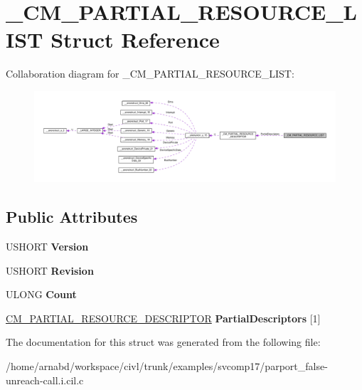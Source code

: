 \hypertarget{struct__CM__PARTIAL__RESOURCE__LIST}{}\section{\+\_\+\+C\+M\+\_\+\+P\+A\+R\+T\+I\+A\+L\+\_\+\+R\+E\+S\+O\+U\+R\+C\+E\+\_\+\+L\+I\+S\+T Struct Reference}
\label{struct__CM__PARTIAL__RESOURCE__LIST}


Collaboration diagram for \+\_\+\+C\+M\+\_\+\+P\+A\+R\+T\+I\+A\+L\+\_\+\+R\+E\+S\+O\+U\+R\+C\+E\+\_\+\+L\+I\+S\+T\+:
\nopagebreak
\begin{figure}[H]
\begin{center}
\leavevmode
\includegraphics[width=350pt]{struct__CM__PARTIAL__RESOURCE__LIST__coll__graph}
\end{center}
\end{figure}
\subsection*{Public Attributes}
\begin{DoxyCompactItemize}
\item 
\hypertarget{struct__CM__PARTIAL__RESOURCE__LIST_ab94e5eced92ff46b1ec836b2b3cce47b}{}U\+S\+H\+O\+R\+T {\bfseries Version}\label{struct__CM__PARTIAL__RESOURCE__LIST_ab94e5eced92ff46b1ec836b2b3cce47b}

\item 
\hypertarget{struct__CM__PARTIAL__RESOURCE__LIST_a8c9256f8dd3fc3ef32e3494a990fe2c6}{}U\+S\+H\+O\+R\+T {\bfseries Revision}\label{struct__CM__PARTIAL__RESOURCE__LIST_a8c9256f8dd3fc3ef32e3494a990fe2c6}

\item 
\hypertarget{struct__CM__PARTIAL__RESOURCE__LIST_ad9c29c0d3cd53e09afe81bc88aa889a7}{}U\+L\+O\+N\+G {\bfseries Count}\label{struct__CM__PARTIAL__RESOURCE__LIST_ad9c29c0d3cd53e09afe81bc88aa889a7}

\item 
\hypertarget{struct__CM__PARTIAL__RESOURCE__LIST_a03aa34d8fa0d42b09c399d7f9f9fd1d3}{}\hyperlink{struct__CM__PARTIAL__RESOURCE__DESCRIPTOR}{C\+M\+\_\+\+P\+A\+R\+T\+I\+A\+L\+\_\+\+R\+E\+S\+O\+U\+R\+C\+E\+\_\+\+D\+E\+S\+C\+R\+I\+P\+T\+O\+R} {\bfseries Partial\+Descriptors} \mbox{[}1\mbox{]}\label{struct__CM__PARTIAL__RESOURCE__LIST_a03aa34d8fa0d42b09c399d7f9f9fd1d3}

\end{DoxyCompactItemize}


The documentation for this struct was generated from the following file\+:\begin{DoxyCompactItemize}
\item 
/home/arnabd/workspace/civl/trunk/examples/svcomp17/parport\+\_\+false-\/unreach-\/call.\+i.\+cil.\+c\end{DoxyCompactItemize}
